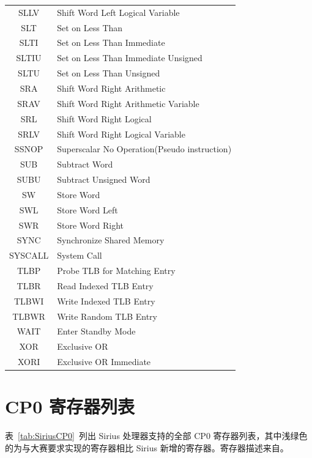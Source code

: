 \documentclass[blue,normal,cn,hide]{elegantbook}
\begin{document}
\begin{longtable}[c]{| c | l |}
    SLLV & Shift Word Left Logical Variable \\
    SLT & Set on Less Than \\
    SLTI & Set on Less Than Immediate \\
    SLTIU & Set on Less Than Immediate Unsigned \\
    SLTU & Set on Less Than Unsigned \\
    SRA & Shift Word Right Arithmetic \\
    SRAV & Shift Word Right Arithmetic Variable \\
    SRL & Shift Word Right Logical \\
    SRLV & Shift Word Right Logical Variable \\
    SSNOP & Superscalar No Operation(Pseudo instruction) \\
    SUB & Subtract Word \\
    SUBU & Subtract Unsigned Word \\
    SW & Store Word \\
    \rowcolor{green!20} SWL & Store Word Left \\
    \rowcolor{green!20} SWR & Store Word Right \\
    \rowcolor{green!20} SYNC & Synchronize Shared Memory \\
    SYSCALL & System Call \\
    \rowcolor{green!20} TLBP & Probe TLB for Matching Entry \\
    \rowcolor{green!20} TLBR & Read Indexed TLB Entry \\
    \rowcolor{green!20} TLBWI & Write Indexed TLB Entry \\
    \rowcolor{green!20} TLBWR & Write Random TLB Entry \\
    \rowcolor{green!20} WAIT & Enter Standby Mode \\
    XOR & Exclusive OR \\
    XORI & Exclusive OR Immediate \\
    \end{longtable}

\section{CP0 寄存器列表} \label{section:CP0}

表~\ref{tab:SiriusCP0}~列出 Sirius 处理器支持的全部 CP0 寄存器列表，其中浅绿色的为与大赛要求实现的寄存器相比
 Sirius 新增的寄存器。寄存器描述来自\cite{MIPS3}。
\end{document}
